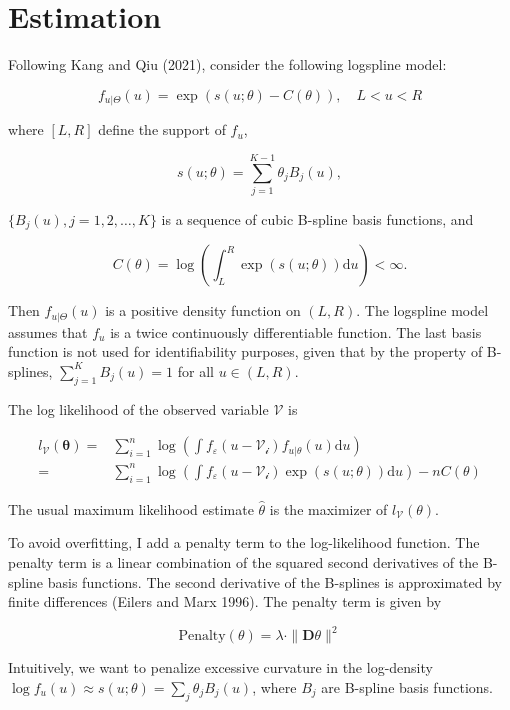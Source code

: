 \documentclass[
  12pt,
  letterpaper,
  oneside,
  openany]{report}
\begin{document}
\section{Estimation}\label{sec-deconvolution-estimation}

Following Kang and Qiu (2021), consider the following logspline model:

\[
f_{u|\Theta}(u)=\exp(s(u;\theta)-C(\theta)), \quad L < u < R
\]

where \([L,R]\) define the support of \(f_u\),

\[
s(u;\theta)=\sum_{j=1}^{K-1}\theta_j B_j(u),
\]

\(\{B_j(u), j=1,2,\dots, K\}\) is a sequence of cubic B-spline basis
functions, and

\[
C(\theta) = \log\left(\int^R_L \exp(s(u;\theta)) \text{d}u \right) < \infty .
\]

Then \(f_{u|\Theta}(u)\) is a positive density function on \((L,R)\).
The logspline model assumes that \(f_u\) is a twice continuously
differentiable function. The last basis function is not used for
identifiability purposes, given that by the property of B-splines,
\(\sum_{j=1}^{K}B_j(u)=1\) for all \(u \in (L,R)\).

The log likelihood of the observed variable \(\mathcal{V}\) is

\[
\begin{aligned}
    l_{\mathcal{V}}(\mathbf{\theta})=&\sum_{i=1}^{n}\log \left(\int f_{\varepsilon}(u-\mathcal{V_i})f_{u|\theta}(u)\text{d}u\right)\\
    =&\sum_{i=1}^{n}\log \left(\int f_{\varepsilon}(u-\mathcal{V_i})\exp(s(u;\theta))\text{d}u\right)-nC(\theta)
\end{aligned}
\]

The usual maximum likelihood estimate \(\hat{\theta}\) is the maximizer
of \(l_{\mathcal{V}}(\theta)\).

To avoid overfitting, I add a penalty term to the log-likelihood
function. The penalty term is a linear combination of the squared second
derivatives of the B-spline basis functions. The second derivative of
the B-splines is approximated by finite differences (Eilers and Marx
1996). The penalty term is given by

\[
\text{Penalty}(\theta) = \lambda \cdot \|\mathbf{D}\theta \|^2
\]

Intuitively, we want to penalize excessive curvature in the log-density
\(\log f_u(u) \approx s(u; \theta) = \sum_j \theta_j B_j(u)\), where
\(B_j\) are B-spline basis functions.
\end{document}

